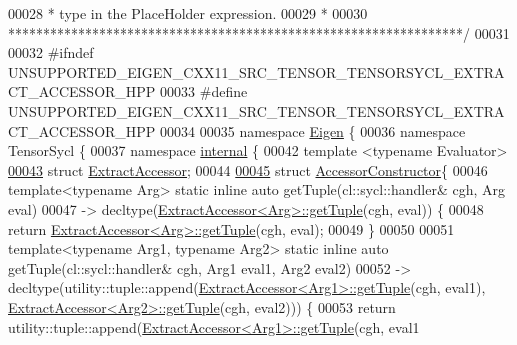 \begin{DoxyCode}
00028 \textcolor{comment}{ * type in the PlaceHolder expression.}
00029 \textcolor{comment}{ *}
00030 \textcolor{comment}{*****************************************************************/}
00031 
00032 \textcolor{preprocessor}{#ifndef UNSUPPORTED\_EIGEN\_CXX11\_SRC\_TENSOR\_TENSORSYCL\_EXTRACT\_ACCESSOR\_HPP}
00033 \textcolor{preprocessor}{#define UNSUPPORTED\_EIGEN\_CXX11\_SRC\_TENSOR\_TENSORSYCL\_EXTRACT\_ACCESSOR\_HPP}
00034 
00035 \textcolor{keyword}{namespace }\hyperlink{namespace_eigen}{Eigen} \{
00036 \textcolor{keyword}{namespace }TensorSycl \{
00037 \textcolor{keyword}{namespace }\hyperlink{namespaceinternal}{internal} \{
00042 \textcolor{keyword}{template} <\textcolor{keyword}{typename} Evaluator>
\hyperlink{struct_eigen_1_1_tensor_sycl_1_1internal_1_1_extract_accessor}{00043} \textcolor{keyword}{struct }\hyperlink{struct_eigen_1_1_tensor_sycl_1_1internal_1_1_extract_accessor}{ExtractAccessor};
00044 
\hyperlink{struct_eigen_1_1_tensor_sycl_1_1internal_1_1_accessor_constructor}{00045} \textcolor{keyword}{struct }\hyperlink{struct_eigen_1_1_tensor_sycl_1_1internal_1_1_accessor_constructor}{AccessorConstructor}\{
00046   \textcolor{keyword}{template}<\textcolor{keyword}{typename} Arg> \textcolor{keyword}{static} \textcolor{keyword}{inline} \textcolor{keyword}{auto} getTuple(cl::sycl::handler& cgh, Arg eval)
00047   -> decltype(\hyperlink{struct_eigen_1_1_tensor_sycl_1_1internal_1_1_extract_accessor}{ExtractAccessor<Arg>::getTuple}(cgh, eval)) \{
00048   \textcolor{keywordflow}{return} \hyperlink{struct_eigen_1_1_tensor_sycl_1_1internal_1_1_extract_accessor}{ExtractAccessor<Arg>::getTuple}(cgh, eval);
00049   \}
00050 
00051   \textcolor{keyword}{template}<\textcolor{keyword}{typename} Arg1, \textcolor{keyword}{typename} Arg2> \textcolor{keyword}{static} \textcolor{keyword}{inline} \textcolor{keyword}{auto} getTuple(cl::sycl::handler& cgh, Arg1 eval1, 
      Arg2 eval2)
00052   -> decltype(utility::tuple::append(\hyperlink{struct_eigen_1_1_tensor_sycl_1_1internal_1_1_extract_accessor}{ExtractAccessor<Arg1>::getTuple}(cgh, 
      eval1), \hyperlink{struct_eigen_1_1_tensor_sycl_1_1internal_1_1_extract_accessor}{ExtractAccessor<Arg2>::getTuple}(cgh, eval2))) \{
00053     \textcolor{keywordflow}{return} utility::tuple::append(\hyperlink{struct_eigen_1_1_tensor_sycl_1_1internal_1_1_extract_accessor}{ExtractAccessor<Arg1>::getTuple}(cgh, eval1

\end{DoxyCode}
